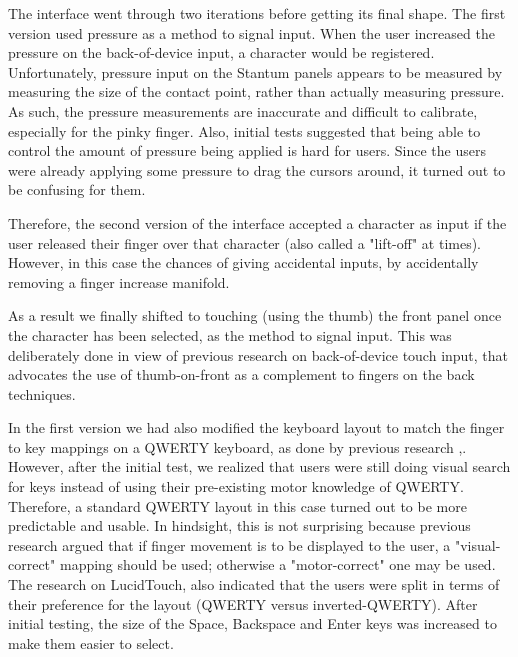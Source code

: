 The interface went through two iterations before getting its final shape. The first version used pressure as a method to signal input. When the user increased the pressure on the back-of-device input, a character would be registered.  Unfortunately, pressure input on the Stantum panels appears to be measured by measuring the size of the contact point, rather than actually measuring pressure.  As such, the pressure measurements are inaccurate and difficult to calibrate, especially for the pinky finger. Also, initial tests suggested that being able to control the amount of pressure being applied is hard for users. Since the users were already applying some pressure to drag the cursors around, it turned out to be confusing for them.

Therefore, the second version of the interface accepted a character as input if the user released their finger over that character (also called a "lift-off" at times). However, in this case the chances of giving accidental inputs, by accidentally removing a finger increase manifold. 

As a result we finally shifted to touching (using the thumb) the front panel once the character has been selected, as the method to signal input. This was deliberately done in view of previous research on back-of-device touch input, that advocates the use of thumb-on-front as a complement to fingers on the back techniques. \cite{Wobbrock} 

In the first version we had also modified the keyboard layout to match the finger to key mappings on a QWERTY keyboard, as done by previous research \cite{RearType},\cite{LucidTouch}. However, after the initial test, we realized that users were still doing visual search for keys instead of using their pre-existing motor knowledge of QWERTY. Therefore, a standard QWERTY layout in this case turned out to be more predictable and usable. In hindsight, this is not surprising because previous research \cite{Wobbrock} argued that if finger movement is to be displayed to the user, a "visual-correct" mapping should be used; otherwise a "motor-correct" one may be used. The research on LucidTouch, also indicated that the users were split in terms of their preference for the layout (QWERTY versus inverted-QWERTY). After initial testing, the size of the Space, Backspace and Enter keys was increased to make them easier to select.

